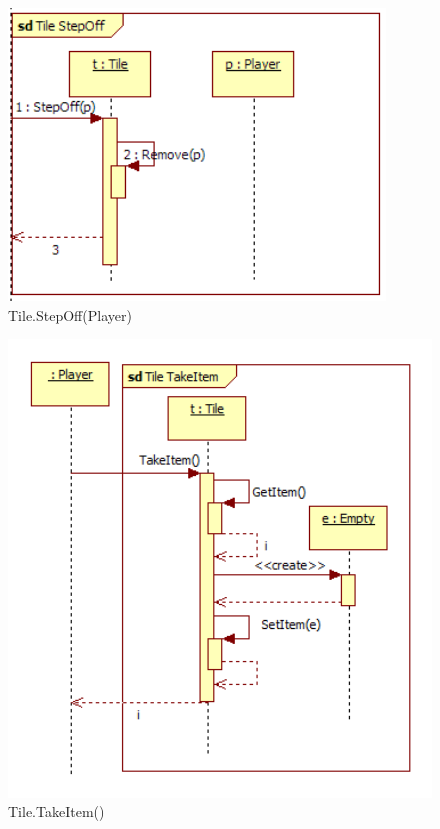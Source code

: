 \begin{figure}[H]
	\begin{center}
		\includegraphics[width=10cm]{chapters/chapter04/seqdiag/Tile_StepOff.png}
		\caption{Tile.StepOff(Player)}
		\label{fig:TileStepOff}
	\end{center}
\end{figure}
\begin{figure}[H]
	\begin{center}
		\includegraphics[width=14cm]{chapters/chapter04/seqdiag/Tile_TakeItem.png}
		\caption{Tile.TakeItem()}
		\label{fig:TileTakeItem}
	\end{center}
\end{figure}

